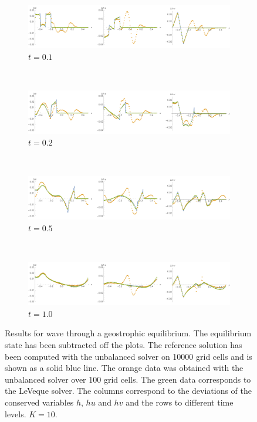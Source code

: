 \begin{figure}
  \centering
  \begin{subfigure}{\textwidth}
    \includegraphics[width=\textwidth]{diagrams/results-geo-wave-1}
    \caption{$t = 0.1$}
    \label{fig:results-geo-wave-1}
  \end{subfigure} \\
  \begin{subfigure}{\textwidth}
    \includegraphics[width=\textwidth]{diagrams/results-geo-wave-2}
    \caption{$t = 0.2$}
    \label{fig:results-geo-wave-2}
  \end{subfigure} \\
  \begin{subfigure}{\textwidth}
    \includegraphics[width=\textwidth]{diagrams/results-geo-wave-5}
    \caption{$t = 0.5$}
    \label{fig:results-geo-wave-5}
  \end{subfigure} \\
  \begin{subfigure}{\textwidth}
    \includegraphics[width=\textwidth]{diagrams/results-geo-wave-10}
    \caption{$t = 1.0$}
    \label{fig:results-geo-wave-10}
  \end{subfigure}
  \caption{Results for wave through a geostrophic equilibrium. The equilibrium state has been subtracted off the plots. The reference solution has been computed with the unbalanced solver on 10000 grid cells and is shown as a solid blue line. The orange data was obtained with the unbalanced solver over 100 grid cells. The green data corresponds to the LeVeque solver. The columns correspond to the deviations of the conserved variables $h$, $hu$ and $hv$ and the rows to different time levels. $K = 10$.}
  \label{fig:results-geo-wave}
\end{figure}

